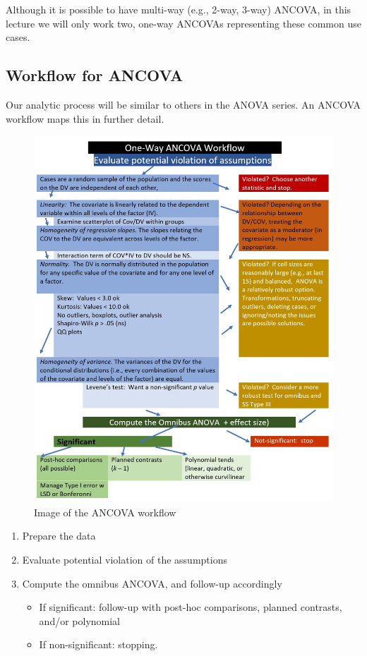 \documentclass[
  11pt,
]{book}
\providecommand{\tightlist}{%
  \setlength{\itemsep}{0pt}\setlength{\parskip}{0pt}}
\begin{document}
Although it is possible to have multi-way (e.g., 2-way, 3-way) ANCOVA, in this lecture we will only work two, one-way ANCOVAs representing these common use cases.

\hypertarget{workflow-for-ancova}{%
\subsection{Workflow for ANCOVA}\label{workflow-for-ancova}}

Our analytic process will be similar to others in the ANOVA series. An ANCOVA workflow maps this in further detail.

\begin{figure}
\centering
\includegraphics{images/ANCOVA/wf_ANCOVA.jpg}
\caption{Image of the ANCOVA workflow}
\end{figure}

\begin{enumerate}
\def\labelenumi{\arabic{enumi}.}
\tightlist
\item
  Prepare the data
\item
  Evaluate potential violation of the assumptions
\item
  Compute the omnibus ANCOVA, and follow-up accordingly

  \begin{itemize}
  \tightlist
  \item
    If significant: follow-up with post-hoc comparisons, planned contrasts, and/or polynomial
  \item
    If non-significant: stopping.
  \end{itemize}
\end{enumerate}
\end{document}
